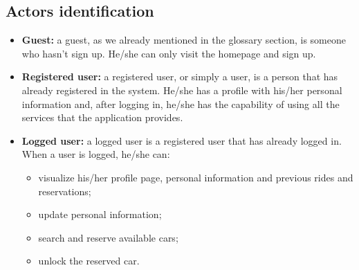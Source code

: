 \pagebreak
\subsection{Actors identification}

\newcommand{\actor}[2]{
	\item \textbf{#1:} #2}

\begin{itemize}
	\actor {Guest}{a guest, as we already mentioned in the glossary section, is someone who hasn't sign up. He/she can only visit the homepage and sign up.}
	\actor{Registered user}{a registered user, or simply a user, is a person that has already registered in the system. He/she has a profile with his/her personal information and, after logging in, he/she has the capability of using all the services that the application provides.}
	\actor{Logged user}{a logged user is a registered user that has already logged in. When a user is logged, he/she can:
		\begin{itemize}
			\item visualize his/her profile page, personal information and previous rides and reservations;
			\item update personal information;
			\item search and reserve available cars;
			\item unlock the reserved car.
		\end{itemize}
	}
\end{itemize}